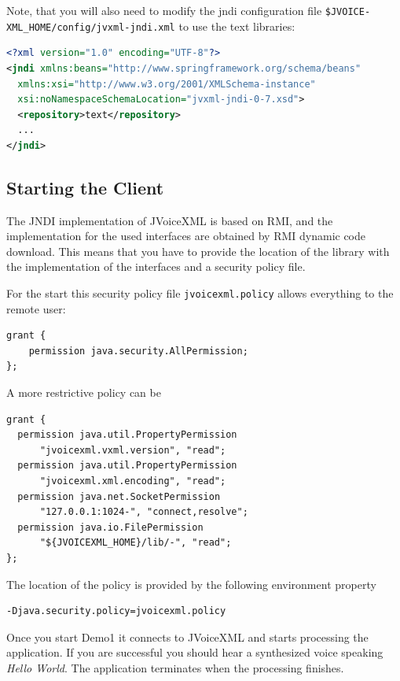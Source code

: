 \documentclass[11pt,a4paper]{book}
\begin{document}
Note, that you will also need to modify the jndi configuration file
\texttt{\${JVOICE-} \texttt{XML\_HOME}/config/jvxml-jndi.xml} to use the text
libraries:

\begin{lstlisting}[language=XML]
<?xml version="1.0" encoding="UTF-8"?>
<jndi xmlns:beans="http://www.springframework.org/schema/beans"
  xmlns:xsi="http://www.w3.org/2001/XMLSchema-instance"
  xsi:noNamespaceSchemaLocation="jvxml-jndi-0-7.xsd">
  <repository>text</repository>
  ...
</jndi>
\end{lstlisting}


\subsection{Starting the Client}
\label{sec:starting-client}

The JNDI implementation of JVoiceXML is based on RMI, and
the implementation for the used interfaces are obtained by
RMI dynamic code download. This means that you have to provide
the location of the library with the implementation of the
interfaces and a security policy file.

For the start this security policy file \texttt{jvoicexml.policy}
allows everything to the remote user:

\begin{lstlisting}
grant {
    permission java.security.AllPermission;
};
\end{lstlisting}

A more restrictive policy can be

\begin{lstlisting}
grant {
  permission java.util.PropertyPermission
      "jvoicexml.vxml.version", "read";
  permission java.util.PropertyPermission
      "jvoicexml.xml.encoding", "read";
  permission java.net.SocketPermission
      "127.0.0.1:1024-", "connect,resolve";
  permission java.io.FilePermission
      "${JVOICEXML_HOME}/lib/-", "read";
};
\end{lstlisting}

The location of the policy is provided by the following environment property

\begin{lstlisting}
-Djava.security.policy=jvoicexml.policy
\end{lstlisting}

Once you start Demo1 it connects to JVoiceXML and starts processing
the application. If you are successful you should hear a synthesized voice
speaking \emph{Hello World}. The application terminates when the processing
finishes.
\end{document}
